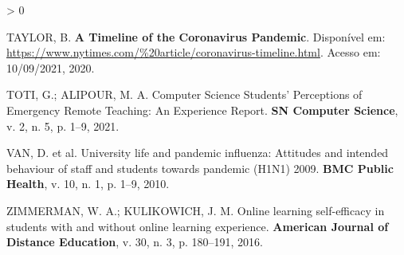 \documentclass[
  12pt,
  portuguese,
]{article}
\newlength{\cslhangindent}
\newenvironment{CSLReferences}[2] %
 {%
  \setlength{\parindent}{0pt}
  \ifodd #1 \everypar{\setlength{\hangindent}{\cslhangindent}}\ignorespaces\fi
  \ifnum #2 > 0
  \setlength{\parskip}{#2\baselineskip}
  \fi
 }%
 {}
\begin{document}
\begin{CSLReferences}{0}{1}
\leavevmode\hypertarget{ref-timeline}{}%
TAYLOR, B.\textbf{{ A Timeline of the Coronavirus Pandemic}}. Disponível
em: \url{https://www.nytimes.com/\%20article/coronavirus-timeline.html}.
Acesso em: 10/09/2021, 2020.

\leavevmode\hypertarget{ref-toti2021}{}%
TOTI, G.; ALIPOUR, M. A. Computer Science Students' Perceptions of
Emergency Remote Teaching: An Experience Report. \textbf{SN Computer
Science}, v. 2, n. 5, p. 1--9, 2021.

\leavevmode\hypertarget{ref-van2010university}{}%
VAN, D. et al. University life and pandemic influenza: Attitudes and
intended behaviour of staff and students towards pandemic (H1N1) 2009.
\textbf{BMC Public Health}, v. 10, n. 1, p. 1--9, 2010.

\leavevmode\hypertarget{ref-zimmerman2016online}{}%
ZIMMERMAN, W. A.; KULIKOWICH, J. M. Online learning self-efficacy in
students with and without online learning experience. \textbf{American
Journal of Distance Education}, v. 30, n. 3, p. 180--191, 2016.

\end{CSLReferences}
\end{document}

